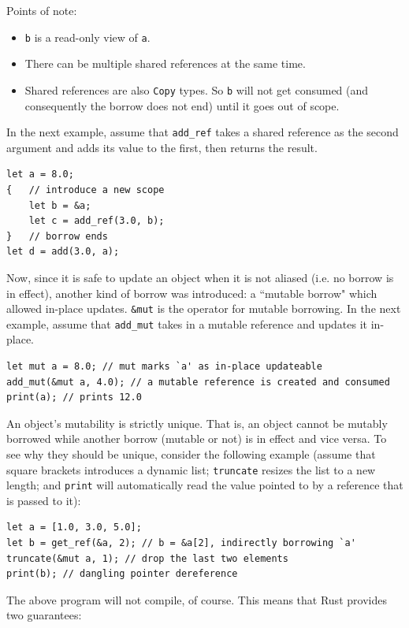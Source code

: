 \documentclass[11pt]{report}
\begin{document}
\noindent Points of note:
\begin{itemize}
\item \texttt{b} is a read-only view of \texttt{a}.
\item There can be multiple shared references at the same time.
\item Shared references are also \texttt{Copy} types. So \texttt{b} will not get consumed (and consequently the borrow does not end) until it goes out of scope.
\end{itemize}

In the next example, assume that \texttt{add\_ref} takes a shared reference as the second argument and adds its value to the first, then returns the result.

\begin{lstlisting}
let a = 8.0;
{   // introduce a new scope
    let b = &a;
    let c = add_ref(3.0, b);
}   // borrow ends
let d = add(3.0, a);
\end{lstlisting}

Now, since it is safe to update an object when it is not aliased (i.e. no borrow is in effect), another kind of borrow was introduced: a ``mutable borrow" which allowed in-place updates. \texttt{\&mut} is the operator for mutable borrowing. In the next example, assume that \texttt{add\_mut} takes in a mutable reference and updates it in-place.

\begin{lstlisting}
let mut a = 8.0; // mut marks `a' as in-place updateable
add_mut(&mut a, 4.0); // a mutable reference is created and consumed
print(a); // prints 12.0
\end{lstlisting}

An object's mutability is strictly unique. That is, an object cannot be mutably borrowed while another borrow (mutable or not) is in effect and vice versa. To see why they should be unique, consider the following example (assume that square brackets introduces a dynamic list; \texttt{truncate} resizes the list to a new length; and \texttt{print} will automatically read the value pointed to by a reference that is passed to it):

\begin{lstlisting}
let a = [1.0, 3.0, 5.0];
let b = get_ref(&a, 2); // b = &a[2], indirectly borrowing `a'
truncate(&mut a, 1); // drop the last two elements
print(b); // dangling pointer dereference
\end{lstlisting}

The above program will not compile, of course. This means that Rust provides two guarantees:
\end{document}

